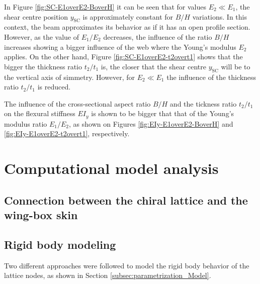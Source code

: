   In Figure \ref{fig:SC-E1overE2-BoverH} it can be seen that for values $E_2 \ll E_1$, the shear centre position $y_{\mathrm{SC}}$ is approximately constant for $B/H$ variations. In this context, the beam approximates its behavior as if it has an open profile section. However, as the value of $E_1/E_2$ decreases, the influence of the ratio $B/H$ increases showing a bigger influence of the web where the Young's modulus $E_2$ applies. On the other hand, Figure \ref{fig:SC-E1overE2-t2overt1} shows that the bigger the thickness ratio $t_2/t_1$ is, the closer that the shear centre $y_{\mathrm{SC}}$ will be to the vertical axis of simmetry. However, for $E_2 \ll E_1$ the influence of the thickness ratio $t_2/t_1$ is reduced.

  The influence of the cross-sectional aspect ratio $B/H$ and the tickness ratio $t_2/t_1$ on the flexural stiffness $E I_y$ is shown to be bigger that that of the Young's modulus ratio $E_1/E_2$, as shown on Figures \ref{fig:EIy-E1overE2-BoverH} and \ref{fig:EIy-E1overE2-t2overt1}, respectively.



\section{Computational model analysis} \label{sec:computationalModelAnalysis_results_model}
  
  \subsection{Connection between the chiral lattice and the wing-box skin} \label{subsec:connection_results_model}

  \subsection{Rigid body modeling} \label{subsec:rigidBody_results_model}

    Two different approaches were followed to model the rigid body behavior of the lattice nodes, as shown in Section \ref{subsec:parametrization_Model}.

